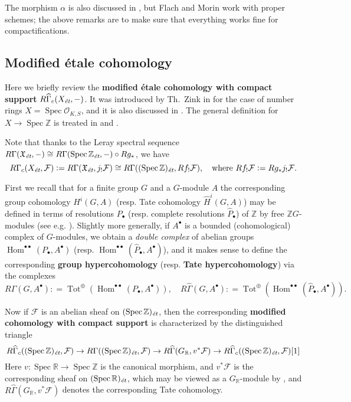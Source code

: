 \documentclass[leqno,12pt]{article}
\theoremstyle{plain}
\theoremstyle{definition}
\DeclareMathOperator{\Spec}{Spec}
\DeclareMathOperator{\Hom}{Hom}
\DeclareMathOperator{\Tot}{Tot}
\newcommand{\RR}{\mathbb{R}}
\newcommand{\ZZ}{\mathbb{Z}}
\newcommand{\dfn}{\mathrel{\mathop:}=}
\newcommand{\et}{\text{\it \'{e}t}}
\begin{document}
The morphism $\alpha$ is also discussed in \cite[Appendix~A]{Flach-Morin-2018},
but Flach and Morin work with proper schemes; the above remarks are to make sure
that everything works fine for compactifications.

\subsection*{Modified \'{e}tale cohomology}

Here we briefly review the
\textbf{modified \'{e}tale cohomology with compact support}
$R\widehat{\Gamma}_c (X_\et, -)$. It was introduced by Th.~Zink in
\cite[Appendix~2]{Haberland-1978} for the case of number rings
$X = \Spec \mathcal{O}_{K,S}$, and it is also discussed in
\cite[\S II.2]{Milne-ADT}. The general definition for $X \to \Spec\ZZ$
is treated in \cite[\S 6.7]{Flach-Morin-2018} and
\cite[\S 2]{Geisser-Schmidt-2018}.

Note that thanks to the Leray spectral sequence
$R\Gamma (\mathfrak{X}_\et, -) \cong R\Gamma (\Spec \ZZ_\et, -)\circ R g_*$,
we have
\begin{equation}
  \label{eqn:RGammac-via-derived-lower-shriek}
  R\Gamma_c (X_\et, \mathcal{F}) \dfn R\Gamma (\mathfrak{X}_\et, j_!\mathcal{F})
  \cong R\Gamma ((\Spec \ZZ)_\et, R f_! \mathcal{F}), \quad
  \text{where } Rf_! \mathcal{F} \dfn R g_* j_! \mathcal{F}.
\end{equation}

First we recall that for a finite group $G$ and a $G$-module $A$ the
corresponding group cohomology $H^i (G,A)$ (resp. Tate cohomology
$\widehat{H}^i (G,A)$) may be defined in terms of resolutions $P_\bullet$
(resp. complete resolutions $\widehat{P}_\bullet$) of $\ZZ$ by free
$\ZZ G$-modules (see e.g. \cite[Chapter~VI]{Brown-1994}). Slightly more
generally, if $A^\bullet$ is a bounded (cohomological) complex of
$G$-modules, we obtain a \emph{double complex} of abelian groups
$\Hom^{\bullet\bullet} (P_\bullet, A^\bullet)$ (resp.  $\Hom^{\bullet\bullet}
(\widehat{P}_\bullet, A^\bullet)$), and it makes sense to define the
corresponding \textbf{group hypercohomology}
(resp. \textbf{Tate hypercohomology}) via the complexes
\[ R\Gamma (G, A^\bullet) \dfn
\Tot^\oplus (\Hom^{\bullet\bullet} (P_\bullet, A^\bullet)), \quad
R\widehat{\Gamma} (G, A^\bullet) \dfn
\Tot^\oplus (\Hom^{\bullet\bullet} (\widehat{P}_\bullet, A^\bullet)). \]

Now if $\mathcal{F}$ is an abelian sheaf on $(\Spec \ZZ)_\et$, then the
corresponding \textbf{modified cohomology with compact support} is characterized
by the distinguished triangle
\[ R\widehat{\Gamma}_c ((\Spec \ZZ)_\et, \mathcal{F}) \to
R\Gamma ((\Spec \ZZ)_\et, \mathcal{F}) \to
R\widehat{\Gamma} (G_\RR, v^* \mathcal{F}) \to
R\widehat{\Gamma}_c ((\Spec \ZZ)_\et, \mathcal{F}) [1] \]
Here $v\colon \Spec \RR \to \Spec \ZZ$ is the canonical morphism, and
$v^* \mathcal{F}$ is the corresponding sheaf on $(\Spec \RR)_\et$, which may be
viewed as a $G_\RR$-module by \cite[Expos\'{e}~VII, 2.3]{SGA4}, and
$R\widehat{\Gamma} (G_\RR, v^* \mathcal{F})$ denotes the corresponding Tate
cohomology.
\end{document}

